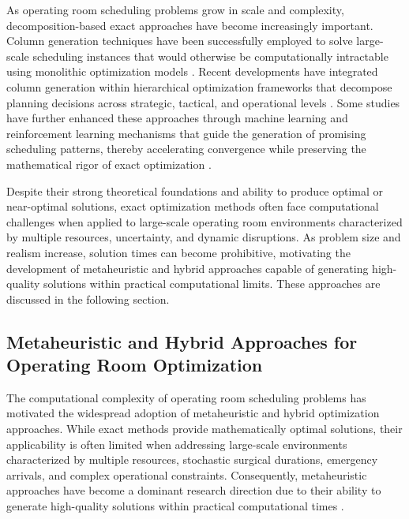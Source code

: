 \documentclass[sn-mathphys-num]{sn-jnl}
\begin{document}
    As operating room scheduling problems grow in scale and complexity, decomposition-based exact approaches have become increasingly important. Column generation techniques have been successfully employed to solve large-scale scheduling instances that would otherwise be computationally intractable using monolithic optimization models \cite{lamiri2008}. Recent developments have integrated column generation within hierarchical optimization frameworks that decompose planning decisions across strategic, tactical, and operational levels \cite{zhao2025optimizing}. Some studies have further enhanced these approaches through machine learning and reinforcement learning mechanisms that guide the generation of promising scheduling patterns, thereby accelerating convergence while preserving the mathematical rigor of exact optimization \cite{zhao2025optimizing}.
    
    Despite their strong theoretical foundations and ability to produce optimal or near-optimal solutions, exact optimization methods often face computational challenges when applied to large-scale operating room environments characterized by multiple resources, uncertainty, and dynamic disruptions. As problem size and realism increase, solution times can become prohibitive, motivating the development of metaheuristic and hybrid approaches capable of generating high-quality solutions within practical computational limits. These approaches are discussed in the following section.

    \subsection*{Metaheuristic and Hybrid Approaches for Operating Room Optimization}

    The computational complexity of operating room scheduling problems has motivated the widespread adoption of metaheuristic and hybrid optimization approaches. While exact methods provide mathematically optimal solutions, their applicability is often limited when addressing large-scale environments characterized by multiple resources, stochastic surgical durations, emergency arrivals, and complex operational constraints. Consequently, metaheuristic approaches have become a dominant research direction due to their ability to generate high-quality solutions within practical computational times \cite{cardoen2010_review,al-amin2024,vieira2025}.
    
\end{document}
